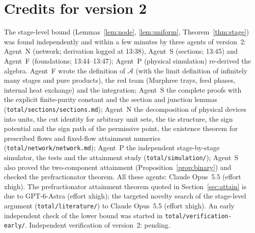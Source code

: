 \section{Credits for version 2}\label{sec:credits2}
The stage-level bound (Lemmas~\ref{lem:node}, \ref{lem:uniform}, Theorem~\ref{thm:stage}) was found independently and
within a few minutes by three agents of version~2: Agent~N (network; derivation logged at 13:38), Agent~S (sections;
13:45) and Agent~F (foundations; 13:44--13:47); Agent~P (physical simulation) re-derived the algebra. Agent~F wrote the
definition of $\mathcal A$ (with the limit definition of infinitely many stages and pure products), the red team (Murphree
trays, feed phases, internal heat exchange) and the integration; Agent~S the complete proofs with the explicit
finite-purity constant and the section and junction lemmas (\texttt{total/sections/sections.md}); Agent~N the
decomposition of physical devices into units, the cut identity for arbitrary unit sets, the tie structure, the sign
potential and the sign path of the permissive point, the existence theorem for prescribed flows and fixed-flow attainment numerics
(\texttt{total/network/network.md}); Agent~P the independent stage-by-stage simulator, the tests and the attainment
study (\texttt{total/simulation/}); Agent~S also proved the two-component attainment (Proposition~\ref{prop:binary})
and checked the prefractionator theorem. All these agents: Claude Opus~5.5 (effort xhigh). The prefractionator
attainment theorem quoted in Section~\ref{sec:attain} is due to GPT-6-Astra (effort xhigh); the
targeted novelty search of the stage-level argument (\texttt{total/literature/}) to Claude Opus~5.5 (effort xhigh).
An early independent check of the lower bound was started in \texttt{total/verification-early/}. Independent verification of version~2: pending.
